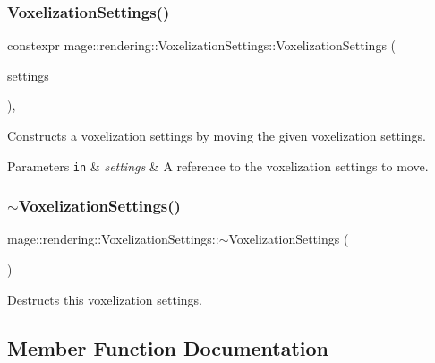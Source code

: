 \subsubsection{\texorpdfstring{Voxelization\+Settings()}{VoxelizationSettings()}\hspace{0.1cm}{\footnotesize\ttfamily [3/3]}}
{\footnotesize\ttfamily constexpr mage\+::rendering\+::\+Voxelization\+Settings\+::\+Voxelization\+Settings (\begin{DoxyParamCaption}\item[{\mbox{\hyperlink{classmage_1_1rendering_1_1_voxelization_settings}{Voxelization\+Settings}} \&\&}]{settings }\end{DoxyParamCaption})\hspace{0.3cm}{\ttfamily [default]}, {\ttfamily [noexcept]}}

Constructs a voxelization settings by moving the given voxelization settings.


\begin{DoxyParams}[1]{Parameters}
\mbox{\tt in}  & {\em settings} & A reference to the voxelization settings to move. \\
\hline
\end{DoxyParams}
\mbox{\label{classmage_1_1rendering_1_1_voxelization_settings_aa9593796b2dd3b9d3a8f6b00ba225778}} 
\subsubsection{\texorpdfstring{$\sim$\+Voxelization\+Settings()}{~VoxelizationSettings()}}
{\footnotesize\ttfamily mage\+::rendering\+::\+Voxelization\+Settings\+::$\sim$\+Voxelization\+Settings (\begin{DoxyParamCaption}{ }\end{DoxyParamCaption})\hspace{0.3cm}{\ttfamily [default]}}

Destructs this voxelization settings. 

\subsection{Member Function Documentation}
\mbox{\label{classmage_1_1rendering_1_1_voxelization_settings_a7092d02a0878dad9ec4fa21ce1024147}} 
